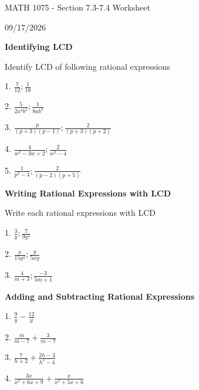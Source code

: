 \documentclass[12pt]{article}
\begin{document}
\vspace*{0.5in}

\begin{center}
    {\LARGE MATH 1075 - Section 7.3-7.4 Worksheet}

    \vspace{2em}

    {\large 09/17/2026}
\end{center}

\vspace{2em}

\textbf{\large Identifying LCD}

\vspace{1.5em}
Identify LCD of following rational expressions
\vspace{1.5em}

1. $\frac{7}{12};\frac{1}{18}  $

\vspace{4.5em}

2. $\frac{5}{2a^{4}b^{2}};\frac{1}{8ab^{3}}  $

\vspace{4.5em}

3. $\frac{p}{(p+3)(p-1)};\frac{2}{(p+3)(p+2)}  $

\vspace{4.5em}

4. $\frac{4}{w^{2}-3w+2};\frac{2}{w^{2}-4} $

\vspace{4.5em}

5. $\frac{1}{p^2-4};\frac{2}{(p-2)(p+5)}$

\newpage

\textbf{\large Writing Rational Expressions with LCD}

\vspace{1.5em}

Write each rational expressions with LCD

\vspace{1.5em}

1. $\frac{3}{y};\frac{7}{9y^{2}}  $

\vspace{4.5em}
2. $\frac{x}{15y^{2}};\frac{y}{5xy}  $

\vspace{4.5em}
3. $\frac{4}{m+3};\frac{-3}{5m+1}   $


\vspace{4.5em}



\textbf{\large Adding and Subtracting Rational Expressions}
\vspace{1.5em}

1. $\frac{9}{y}-\frac{12}{y}  $

\vspace{4.5em}

2. $\frac{m}{m-7}+\frac{3}{m-7}  $

\vspace{4.5em}

3. $\frac{7}{h+2}+\frac{2h-3}{h^{2}-4}  $

\vspace{4.5em}

4. $\frac{3x}{x^{2}+6x+9}+\frac{x}{x^{2}+5x+6}  $
\end{document}
